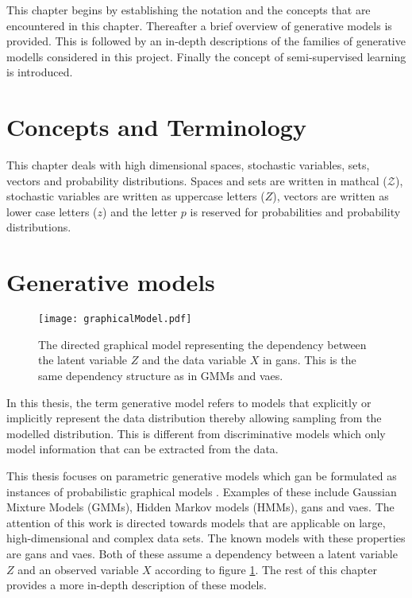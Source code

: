 This chapter begins by establishing the notation and the concepts that are encountered in this chapter. Thereafter a brief overview of generative models is provided. This is followed by an in-depth descriptions of the families of generative modells considered in this project. Finally the concept of semi-supervised learning is introduced.

\section{Concepts and Terminology}
This chapter deals with high dimensional spaces, stochastic variables, sets, vectors and probability distributions. Spaces and sets are written in mathcal ($\mathcal{Z}$), stochastic variables are written as uppercase letters ($Z$), vectors are written as lower case letters ($z$) and the letter $p$ is reserved for probabilities and probability distributions.

\section{Generative models}
\begin{figure}[t]
    \centering
    \texttt{[image: graphicalModel.pdf]}
    \caption{The directed graphical model representing the dependency between the latent variable $Z$ and the data variable $X$ in \acrshort{gans}. This is the same dependency structure as in GMMs and \acrshort{vaes}.}
    \label{fig:GANgraph}
\end{figure}
In this thesis, the term generative model refers to models that explicitly or implicitly represent the data distribution thereby allowing sampling from the modelled distribution. This is different from discriminative models which only model information that can be extracted from the data. 

This thesis focuses on parametric generative models which gan be formulated as instances of probabilistic graphical models \parencite{christopher2016pattern}. Examples of these include Gaussian Mixture Models (GMMs), Hidden Markov models (HMMs), \acrfull{gans} and \acrfull{vaes}. The attention of this work is directed towards models that are applicable on large, high-dimensional and complex data sets. The known models with these properties are  \acrshort{gans} and \acrshort{vaes}. Both of these assume a dependency between a latent variable $Z$ and an observed variable $X$ according to figure \ref{fig:GANgraph}. The rest of this chapter provides a more in-depth description of these models. 

